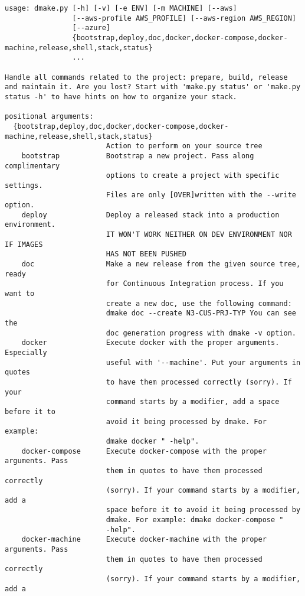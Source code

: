 \begin{lstlisting}[style=console,caption={Dmake basic usage}]
usage: dmake.py [-h] [-v] [-e ENV] [-m MACHINE] [--aws]
                [--aws-profile AWS_PROFILE] [--aws-region AWS_REGION]
                [--azure]
                {bootstrap,deploy,doc,docker,docker-compose,docker-machine,release,shell,stack,status}
                ...

Handle all commands related to the project: prepare, build, release and maintain it. Are you lost? Start with 'make.py status' or 'make.py status -h' to have hints on how to organize your stack.

positional arguments:
  {bootstrap,deploy,doc,docker,docker-compose,docker-machine,release,shell,stack,status}
                        Action to perform on your source tree
    bootstrap           Bootstrap a new project. Pass along complimentary
                        options to create a project with specific settings.
                        Files are only [OVER]written with the --write option.
    deploy              Deploy a released stack into a production environment.
                        IT WON'T WORK NEITHER ON DEV ENVIRONMENT NOR IF IMAGES
                        HAS NOT BEEN PUSHED
    doc                 Make a new release from the given source tree, ready
                        for Continuous Integration process. If you want to
                        create a new doc, use the following command:
                        dmake doc --create N3-CUS-PRJ-TYP You can see the
                        doc generation progress with dmake -v option.
    docker              Execute docker with the proper arguments. Especially
                        useful with '--machine'. Put your arguments in quotes
                        to have them processed correctly (sorry). If your
                        command starts by a modifier, add a space before it to
                        avoid it being processed by dmake. For example:
                        dmake docker " -help".
    docker-compose      Execute docker-compose with the proper arguments. Pass
                        them in quotes to have them processed correctly
                        (sorry). If your command starts by a modifier, add a
                        space before it to avoid it being processed by
                        dmake. For example: dmake docker-compose "
                        -help".
    docker-machine      Execute docker-machine with the proper arguments. Pass
                        them in quotes to have them processed correctly
                        (sorry). If your command starts by a modifier, add a

\end{lstlisting}
